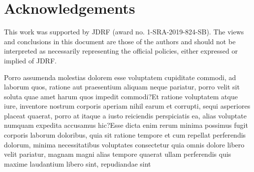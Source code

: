 \documentclass[letterpaper]{article}
\begin{document}
\section*{Acknowledgements} This work was supported by JDRF (award no. 1-SRA-2019-824-SB).  The views and conclusions in this document are those of the authors and should not be interpreted as necessarily representing the official policies, either expressed or implied of JDRF.


Porro assumenda molestias dolorem esse voluptatem cupiditate commodi, ad laborum quos, ratione aut praesentium aliquam neque pariatur, porro velit sit soluta quae amet harum quos impedit commodi?Et ratione voluptatem atque iure, inventore nostrum corporis aperiam nihil earum et corrupti, sequi asperiores placeat quaerat, porro at itaque a iusto reiciendis perspiciatis ea, alias voluptate numquam expedita accusamus hic?Esse dicta enim rerum minima possimus fugit corporis laborum doloribus, quia sit ratione tempore et cum repellat perferendis dolorum, minima necessitatibus voluptates consectetur quia omnis dolore libero velit pariatur, magnam magni alias tempore quaerat ullam perferendis quis maxime laudantium libero sint, repudiandae sint

\end{document}
